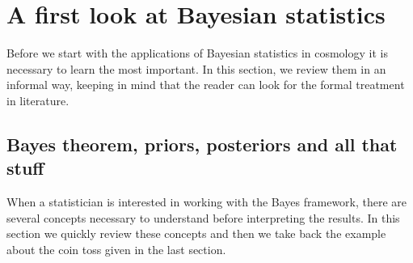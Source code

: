 \documentclass[onecolumn,           %
               showpacs,            %
               preprintnumbers,     %
               aps,                 %
               prl,          	    %
               letterpaper,             %
               superscriptaddress,      %
               nofootinbib,         %
               tightenlines,        %
               floats,floatfix      %
               ,usenatbib,
               ]{revtex4-1}
\begin{document}

\section{A first look at Bayesian statistics}

Before we start with the applications of Bayesian statistics in cosmology it is necessary to learn the most important. In this section, we review them in an informal way, keeping in mind that the reader can look for the formal treatment in literature.   

\subsection{Bayes theorem, priors, posteriors and all that stuff}\label{BTPP}

When a statistician is interested in working with the Bayes framework, there are several concepts necessary to understand before interpreting the results. In this section we quickly review these concepts and then we take back the example about the coin toss given in the last section. 
\end{document}
